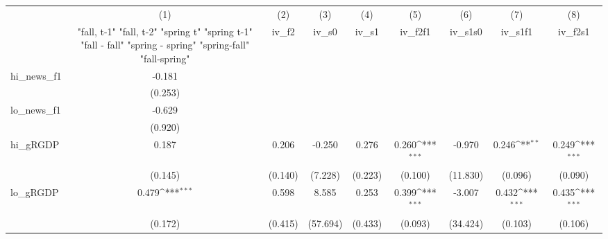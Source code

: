 {
\def\sym#1{\ifmmode^{#1}\else\(^{#1}\)\fi}
\begin{tabular}{l*{8}{c}}
\toprule
            &\multicolumn{1}{c}{(1)}&\multicolumn{1}{c}{(2)}&\multicolumn{1}{c}{(3)}&\multicolumn{1}{c}{(4)}&\multicolumn{1}{c}{(5)}&\multicolumn{1}{c}{(6)}&\multicolumn{1}{c}{(7)}&\multicolumn{1}{c}{(8)}\\
            &\multicolumn{1}{c}{  "fall, t-1" "fall, t-2" "spring t" "spring t-1"  "fall - fall" "spring - spring" "spring-fall" "fall-spring" }&\multicolumn{1}{c}{iv\_f2}&\multicolumn{1}{c}{iv\_s0}&\multicolumn{1}{c}{iv\_s1}&\multicolumn{1}{c}{iv\_f2f1}&\multicolumn{1}{c}{iv\_s1s0}&\multicolumn{1}{c}{iv\_s1f1}&\multicolumn{1}{c}{iv\_f2s1}\\
\midrule
hi\_news\_f1  &      -0.181         &                     &                     &                     &                     &                     &                     &                     \\
            &     (0.253)         &                     &                     &                     &                     &                     &                     &                     \\
\addlinespace
lo\_news\_f1  &      -0.629         &                     &                     &                     &                     &                     &                     &                     \\
            &     (0.920)         &                     &                     &                     &                     &                     &                     &                     \\
\addlinespace
hi\_gRGDP    &       0.187         &       0.206         &      -0.250         &       0.276         &       0.260\sym{***}&      -0.970         &       0.246\sym{**} &       0.249\sym{***}\\
            &     (0.145)         &     (0.140)         &     (7.228)         &     (0.223)         &     (0.100)         &    (11.830)         &     (0.096)         &     (0.090)         \\
\addlinespace
lo\_gRGDP    &       0.479\sym{***}&       0.598         &       8.585         &       0.253         &       0.399\sym{***}&      -3.007         &       0.432\sym{***}&       0.435\sym{***}\\
            &     (0.172)         &     (0.415)         &    (57.694)         &     (0.433)         &     (0.093)         &    (34.424)         &     (0.103)         &     (0.106)         \\

\end{tabular}}
